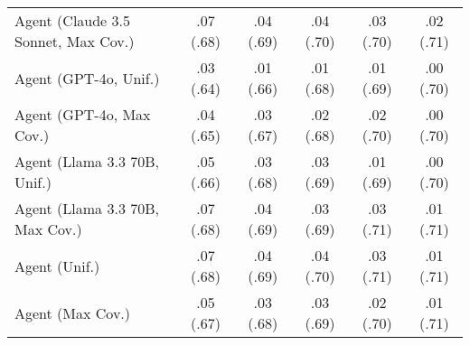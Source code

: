 \begin{table}[h!]
\begin{tabular}{lccccc}
    Agent (Claude 3.5 Sonnet, Max Cov.) & .07 {\small (.68)} & \cellcolor{bronze!30}.04 {\small (.69)} & \cellcolor{bronze!30}.04 {\small (.70)} & .03 {\small (.70)} & \cellcolor{silver!30}.02 {\small (.71)} \\
    Agent (GPT-4o, Unif.) & .03 {\small (.64)} & .01 {\small (.66)} & .01 {\small (.68)} & .01 {\small (.69)} & .00 {\small (.70)} \\
    Agent (GPT-4o, Max Cov.) & .04 {\small (.65)} & .03 {\small (.67)} & .02 {\small (.68)} & .02 {\small (.70)} & .00 {\small (.70)} \\
    Agent (Llama 3.3 70B, Unif.) & .05 {\small (.66)} & .03 {\small (.68)} & .03 {\small (.69)} & .01 {\small (.69)} & .00 {\small (.70)} \\
    Agent (Llama 3.3 70B, Max Cov.) & \cellcolor{bronze!30}.07 {\small (.68)} & .04 {\small (.69)} & .03 {\small (.69)} & \cellcolor{bronze!30}.03 {\small (.71)} & \cellcolor{bronze!30}.01 {\small (.71)} \\
    Agent (Unif.) & .07 {\small (.68)} & .04 {\small (.69)} & .04 {\small (.70)} & \cellcolor{bronze!30}.03 {\small (.71)} & .01 {\small (.71)} \\
    Agent (Max Cov.) & .05 {\small (.67)} & .03 {\small (.68)} & .03 {\small (.69)} & .02 {\small (.70)} & .01 {\small (.71)} \\
    \bottomrule
    \end{tabular}
\end{table}